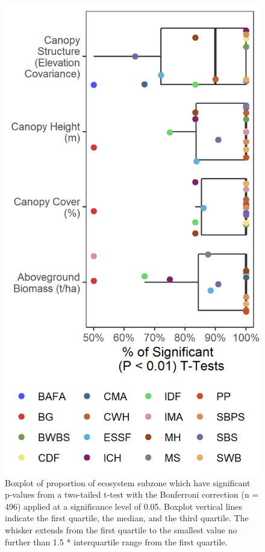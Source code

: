 \documentclass[11pt]{article}
\makeatletter
\def\maxwidth{\ifdim\Gin@nat@width>\linewidth\linewidth
\else\Gin@nat@width\fi}
\let\Oldincludegraphics\includegraphics
\renewcommand{\includegraphics}[1]{\Oldincludegraphics[width=\maxwidth]{#1}}
\makeatother
\begin{document}
\begin{figure}
\hypertarget{fig:t-test-plot}{%
\centering
\includegraphics{figures/t_tests_scatter.png}
\caption{Boxplot of proportion of ecosystem subzone which have
significant p-values from a two-tailed t-test with the Bonferroni
correction (n = 496) applied at a significance level of 0.05. Boxplot
vertical lines indicate the first quartile, the median, and the third
quartile. The whisker extends from the first quartile to the smallest
value no further than 1.5 * interquartile range from the first
quartile.}\label{fig:t-test-plot}
}
\end{figure}
\end{document}
